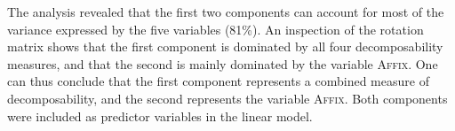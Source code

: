 \begin{table}[H]
	\caption{ Summary of principal components}
	\label{tbl: summary PC in corpus}
	\begin{center}
	\end{center}

\vspace*{-0.4cm}
\end{table}



The analysis revealed that the first two components can account for most of the variance expressed by the five variables (81\%). An inspection of the rotation matrix shows that the first component is dominated by all four decomposability measures, and that the second is mainly dominated by the variable \textsc{Affix}. One can thus conclude that the first component represents a combined measure of decomposability, and the second represents the variable \textsc{Affix}. 
Both components were included as predictor variables in the linear model.  




